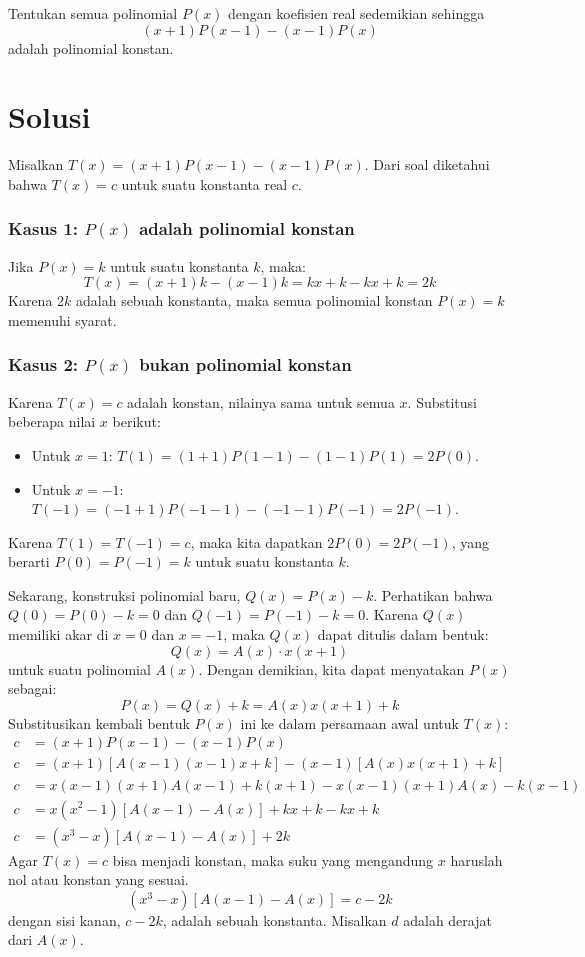 \begin{problem}[CMO 2013]
Tentukan semua polinomial $P(x)$ dengan koefisien real sedemikian sehingga
\[ (x+1)P(x-1) - (x-1)P(x) \]
adalah polinomial konstan.
\end{problem}

\section*{Solusi}

Misalkan $T(x) = (x+1)P(x-1) - (x-1)P(x)$. Dari soal diketahui bahwa $T(x)=c$ untuk suatu konstanta real $c$.

\subsubsection*{Kasus 1: $P(x)$ adalah polinomial konstan}
Jika $P(x) = k$ untuk suatu konstanta $k$, maka:
\[ T(x) = (x+1)k - (x-1)k = kx + k - kx + k = 2k \]
Karena $2k$ adalah sebuah konstanta, maka semua polinomial konstan $P(x)=k$ memenuhi syarat.

\subsubsection*{Kasus 2: $P(x)$ bukan polinomial konstan}
Karena $T(x)=c$ adalah konstan, nilainya sama untuk semua $x$. Substitusi beberapa nilai $x$ berikut:
\begin{itemize}
    \item Untuk $x=1$: \quad $T(1) = (1+1)P(1-1) - (1-1)P(1) = 2P(0)$.
    \item Untuk $x=-1$: \quad $T(-1) = (-1+1)P(-1-1) - (-1-1)P(-1) = 2P(-1)$.
\end{itemize}
Karena $T(1) = T(-1) = c$, maka kita dapatkan $2P(0) = 2P(-1)$, yang berarti $P(0) = P(-1) = k$ untuk suatu konstanta $k$.

Sekarang, konstruksi polinomial baru, $Q(x) = P(x) - k$.
Perhatikan bahwa $Q(0) = P(0) - k = 0$ dan $Q(-1) = P(-1) - k = 0$.
Karena $Q(x)$ memiliki akar di $x=0$ dan $x=-1$, maka $Q(x)$ dapat ditulis dalam bentuk:
\[ Q(x) = A(x) \cdot x(x+1) \]
untuk suatu polinomial $A(x)$. Dengan demikian, kita dapat menyatakan $P(x)$ sebagai:
\[ P(x) = Q(x) + k = A(x)x(x+1) + k \]
Substitusikan kembali bentuk $P(x)$ ini ke dalam persamaan awal untuk $T(x)$:
\begin{align*}
    c &= (x+1)P(x-1) - (x-1)P(x) \\
    c &= (x+1)\left[ A(x-1)(x-1)x + k \right] - (x-1)\left[ A(x)x(x+1) + k \right] \\
    c &= x(x-1)(x+1)A(x-1) + k(x+1) - x(x-1)(x+1)A(x) - k(x-1) \\
    c &= x(x^2-1) \left[ A(x-1) - A(x) \right] + kx + k - kx + k \\
    c &= (x^3-x) \left[ A(x-1) - A(x) \right] + 2k
\end{align*}
Agar $T(x)=c$ bisa menjadi konstan, maka suku yang mengandung $x$ haruslah nol atau konstan yang sesuai.
\[ (x^3-x) \left[ A(x-1) - A(x) \right] = c - 2k \]
dengan sisi kanan, $c-2k$, adalah sebuah konstanta. Misalkan $d$ adalah derajat dari $A(x)$.

